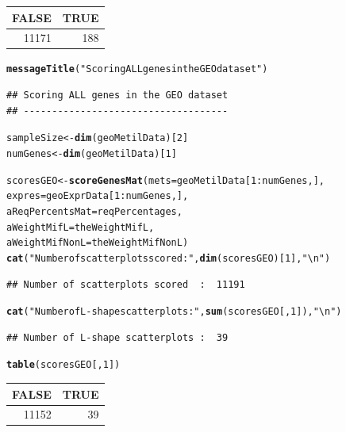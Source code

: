 \documentclass[a4paper,10pt]{article}\usepackage[]{graphicx}\usepackage[]{color}
\makeatletter
\newcommand{\hlnum}[1]{\textcolor[rgb]{0.686,0.059,0.569}{#1}}%
\newcommand{\hlstr}[1]{\textcolor[rgb]{0.192,0.494,0.8}{#1}}%
\newcommand{\hlopt}[1]{\textcolor[rgb]{0,0,0}{#1}}%
\newcommand{\hlstd}[1]{\textcolor[rgb]{0.345,0.345,0.345}{#1}}%
\newcommand{\hlkwb}[1]{\textcolor[rgb]{0.69,0.353,0.396}{#1}}%
\newcommand{\hlkwc}[1]{\textcolor[rgb]{0.333,0.667,0.333}{#1}}%
\newcommand{\hlkwd}[1]{\textcolor[rgb]{0.737,0.353,0.396}{\textbf{#1}}}%
\newenvironment{kframe}{%
 \def\at@end@of@kframe{}%
 \ifinner\ifhmode%
  \def\at@end@of@kframe{\end{minipage}}%
  \begin{minipage}{\columnwidth}%
 \fi\fi%
 \def\FrameCommand##1{\hskip\@totalleftmargin \hskip-\fboxsep
 \colorbox{shadecolor}{##1}\hskip-\fboxsep
     \hskip-\linewidth \hskip-\@totalleftmargin \hskip\columnwidth}%
 \MakeFramed {\advance\hsize-\width
   \@totalleftmargin\z@ \linewidth\hsize
   \@setminipage}}%
 {\par\unskip\endMakeFramed%
 \at@end@of@kframe}
\newenvironment{knitrout}{}{} %
\makeatother
\begin{document}
\begin{knitrout}
\begin{tabular}{r|r}
\hline
FALSE & TRUE\\
\hline
11171 & 188\\
\hline
\end{tabular}
\end{knitrout}

\begin{knitrout}
\color{fgcolor}\begin{kframe}
\begin{alltt}
\hlkwd{messageTitle}\hlstd{(}\hlstr{"Scoring ALL genes in the GEO dataset"}\hlstd{)}
\end{alltt}
\begin{verbatim}
## Scoring ALL genes in the GEO dataset 
## ------------------------------------
\end{verbatim}
\begin{alltt}
\hlstd{sampleSize} \hlkwb{<-} \hlkwd{dim}\hlstd{(geoMetilData)[}\hlnum{2}\hlstd{]}
\hlstd{numGenes} \hlkwb{<-}   \hlkwd{dim}\hlstd{(geoMetilData)[}\hlnum{1}\hlstd{]}

\hlstd{scoresGEO} \hlkwb{<-} \hlkwd{scoreGenesMat} \hlstd{(}\hlkwc{mets}\hlstd{=geoMetilData[}\hlnum{1}\hlopt{:}\hlstd{numGenes,],}
                            \hlkwc{expres}\hlstd{=geoExprData[}\hlnum{1}\hlopt{:}\hlstd{numGenes,],}
                            \hlkwc{aReqPercentsMat}\hlstd{=reqPercentages,}
                            \hlkwc{aWeightMifL}\hlstd{=theWeightMifL,}
                            \hlkwc{aWeightMifNonL}\hlstd{=theWeightMifNonL )}
\hlkwd{cat}\hlstd{(}\hlstr{"Number of scatterplots scored  : "}\hlstd{,} \hlkwd{dim}\hlstd{(scoresGEO)[}\hlnum{1}\hlstd{],} \hlstr{"\textbackslash{}n"}\hlstd{)}
\end{alltt}
\begin{verbatim}
## Number of scatterplots scored  :  11191
\end{verbatim}
\begin{alltt}
\hlkwd{cat}\hlstd{(}\hlstr{"Number of L-shape scatterplots : "}\hlstd{,} \hlkwd{sum}\hlstd{(scoresGEO[,}\hlnum{1}\hlstd{]),} \hlstr{"\textbackslash{}n"}\hlstd{)}
\end{alltt}
\begin{verbatim}
## Number of L-shape scatterplots :  39
\end{verbatim}
\begin{alltt}
\hlkwd{table}\hlstd{(scoresGEO[,}\hlnum{1}\hlstd{])}
\end{alltt}
\end{kframe}


\begin{tabular}{r|r}
\hline
FALSE & TRUE\\
\hline
11152 & 39\\
\hline
\end{tabular}
\end{knitrout}
\end{document}
